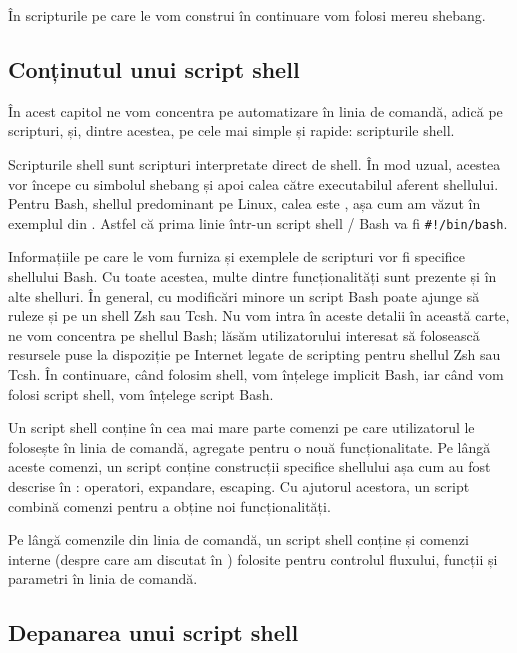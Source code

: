 În scripturile pe care le vom construi în continuare vom folosi mereu shebang.

\subsection{Conținutul unui script shell}
\label{sec:auto:dev:content}

În acest capitol ne vom concentra pe automatizare în
linia de comandă, adică pe scripturi, și, dintre acestea, pe cele mai simple și
rapide: scripturile shell.

Scripturile shell sunt scripturi interpretate direct de shell.
În mod uzual, acestea vor începe cu simbolul shebang și apoi calea către executabilul aferent shellului.
Pentru Bash, shellul predominant pe Linux, calea este , așa cum am văzut în exemplul din .
Astfel că prima linie într-un script shell / Bash va fi \texttt{\#!/bin/bash}.

Informațiile pe care le vom furniza și exemplele de scripturi vor fi specifice shellului Bash.
Cu toate acestea, multe dintre funcționalități sunt prezente și în alte shelluri.
În general, cu modificări minore un script Bash poate ajunge să ruleze și pe un shell Zsh sau Tcsh.
Nu vom intra în aceste detalii în această carte, ne vom concentra pe shellul Bash; lăsăm utilizatorului interesat să folosească resursele puse la dispoziție pe Internet legate de scripting pentru shellul Zsh sau Tcsh.
În continuare, când folosim shell, vom înțelege implicit Bash, iar când vom folosi script shell, vom înțelege script Bash.

Un script shell conține în cea mai mare parte comenzi pe care utilizatorul le folosește în linia de comandă, agregate pentru o nouă funcționalitate.
Pe lângă aceste comenzi, un script conține construcții specifice shellului așa cum au fost descrise în : operatori, expandare, escaping.
Cu ajutorul acestora, un script combină comenzi pentru a obține noi funcționalități.

Pe lângă comenzile din linia de comandă, un script shell conține și comenzi interne (despre care am discutat în ) folosite pentru controlul fluxului, funcții și parametri în linia de comandă.

\subsection{Depanarea unui script shell}
\label{sec:auto:dev:debug}

